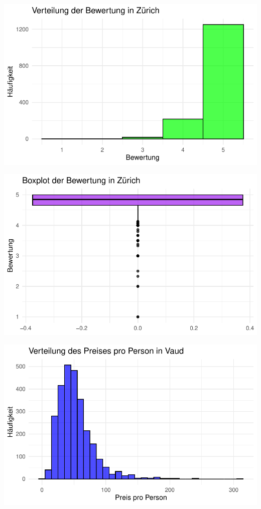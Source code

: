 \documentclass[
  journal,
]{IEEEtran}%
\begin{document}
\includegraphics{main_files/figure-pdf/descriptive zurich-3.pdf}

\includegraphics{main_files/figure-pdf/descriptive zurich-4.pdf}

\includegraphics{main_files/figure-pdf/descriptive vaud-1.pdf}
\end{document}
